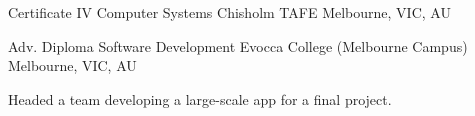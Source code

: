 

\begin{cventries}

  \cventry
    {Certificate IV Computer Systems} %
    {Chisholm TAFE} %
    {}
    {Melbourne, VIC, AU} %
    {}

  \cventry
    {Adv. Diploma Software Development} %
    {Evocca College (Melbourne Campus)} %
    {}
    {Melbourne, VIC, AU} %
    {
      \begin{cvitems}
        \item {Headed a team developing a large-scale app for a final project.}
      \end{cvitems}
    }
\end{cventries}
